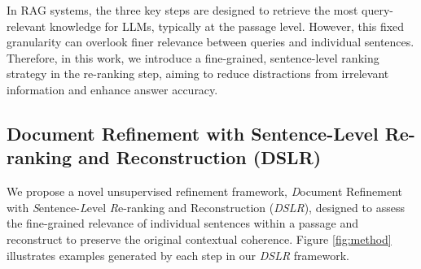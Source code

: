 In RAG systems, the three key steps are designed to retrieve the most query-relevant knowledge for LLMs, typically at the passage level. However, this fixed granularity can overlook finer relevance between queries and individual sentences.
Therefore, in this work, we introduce a fine-grained, sentence-level ranking strategy in the re-ranking step, aiming to reduce distractions from irrelevant information and enhance answer accuracy.




\subsection{Document Refinement with Sentence-Level Re-ranking and Reconstruction (DSLR)}

We propose a novel unsupervised refinement framework, \textit{D}ocument Refinement with \textit{S}entence-\textit{L}evel \textit{R}e-ranking and Reconstruction (\textit{DSLR}), designed to assess the fine-grained relevance of individual sentences within a passage and reconstruct to preserve the original contextual coherence. 
Figure \ref{fig:method} illustrates examples generated by each step in our \textit{DSLR} framework.


